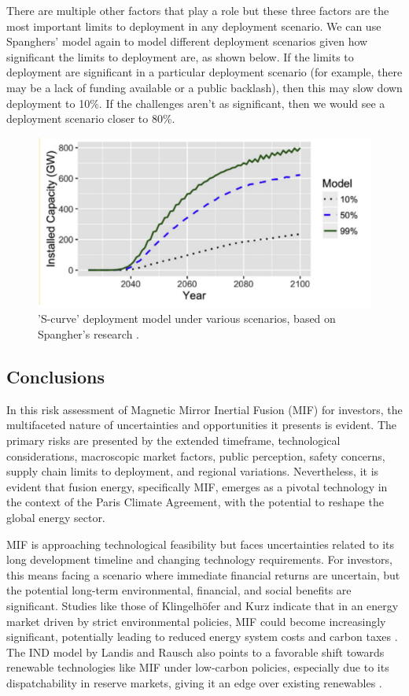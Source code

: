 There are multiple other factors that play a role but these three factors are the most important limits to deployment in any deployment scenario. We can use Spanghers’ model again to model different deployment scenarios given how significant the limits to deployment are, as shown below. If the limits to deployment are significant in a particular deployment scenario (for example, there may be a lack of funding available or a public backlash), then this may slow down deployment to 10\%. If the challenges aren’t as significant, then we would see a deployment scenario closer to 80\%. 

\begin{figure}[h!]
    \centering
    \includegraphics[width =0.65\linewidth]{SubreportFigures/spangher_limits.pdf}
    \caption{'S-curve' deployment model under various scenarios, based on Spangher's research \cite{spangher2019characterizing}. }
    \label{fig:spangher_gdp}
\end{figure}
 

\subsection{Conclusions}

In this risk assessment of Magnetic Mirror Inertial Fusion (MIF) for investors, the multifaceted nature of uncertainties and opportunities it presents is evident. The primary risks are presented by the extended timeframe, technological considerations,  macroscopic market factors, public perception, safety concerns, supply chain limits to deployment, and regional variations. Nevertheless, it is evident that fusion energy, specifically MIF, emerges as a pivotal technology in the context of the Paris Climate Agreement, with the potential to reshape the global energy sector.

MIF is approaching technological feasibility but faces uncertainties related to its long development timeline and changing technology requirements. For investors, this means facing a scenario where immediate financial returns are uncertain, but the potential long-term environmental, financial, and social benefits are significant. Studies like those of Klingelhöfer and Kurz indicate that in an energy market driven by strict environmental policies, MIF could become increasingly significant, potentially leading to reduced energy system costs and carbon taxes \cite{klingelhofer2011financial}. The IND model by Landis and Rausch also points to a favorable shift towards renewable technologies like MIF under low-carbon policies, especially due to its dispatchability in reserve markets, giving it an edge over existing renewables  \cite{landis2017deep}.

